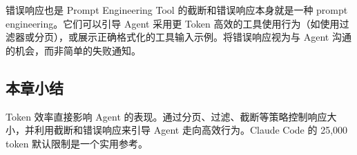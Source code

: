 \begin{knowledgebox}{错误响应也是 Prompt Engineering}
Tool 的截断和错误响应本身就是一种 prompt engineering。它们可以引导 Agent 采用更 Token 高效的工具使用行为（如使用过滤器或分页），或展示正确格式化的工具输入示例。将错误响应视为与 Agent 沟通的机会，而非简单的失败通知。
\end{knowledgebox}

\subsection{本章小结}

Token 效率直接影响 Agent 的表现。通过分页、过滤、截断等策略控制响应大小，并利用截断和错误响应来引导 Agent 走向高效行为。Claude Code 的 25,000 token 默认限制是一个实用参考。



